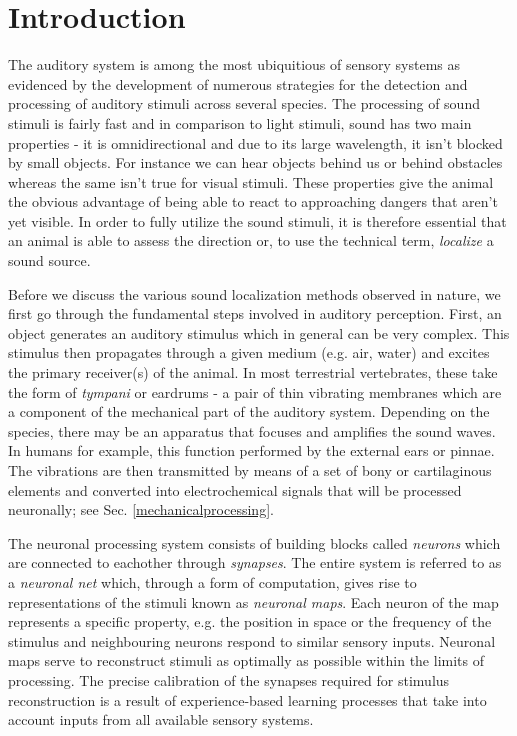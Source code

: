 \chapter{Introduction}\label{introchapter}
The auditory system is among the most ubiquitious of sensory systems as evidenced by the 
development of numerous strategies for the detection and processing of auditory stimuli
across several species. The processing of sound stimuli is fairly fast and in comparison
to light stimuli, sound has two main properties - it is omnidirectional and due to
its large wavelength, it isn't blocked by small objects. For instance we can hear objects
behind us or behind obstacles whereas the same isn't true for visual stimuli. These properties 
give the animal the obvious advantage of being able to react to approaching dangers that
aren't yet visible. In order to fully utilize the sound stimuli, it is therefore essential
that an animal is able to assess the direction or, to use the technical term, \textit{localize} a sound source.

Before we discuss the various sound localization methods observed in nature, we first
go through the fundamental steps involved in auditory perception. First, an object generates
an auditory stimulus which in general can be very complex. This stimulus then propagates
through a given medium (e.g. air, water) and excites the primary receiver(s) of the animal. In most
terrestrial vertebrates, these take the form of \textit{tympani} or eardrums - a pair of thin vibrating
membranes which are a component of the mechanical part of the auditory system.
Depending on the species, there may be an apparatus that focuses and amplifies the sound waves. In
humans for example, this function performed by the external ears or pinnae. 
The vibrations are then transmitted by means of a set of bony or cartilaginous elements and
converted into electrochemical signals that will be processed neuronally; see Sec. \ref{mechanicalprocessing}.

The neuronal processing system consists of building blocks called \textit{neurons} which are
connected to eachother through \textit{synapses}. The entire system is referred to as a 
\textit{neuronal net} which, through a form of computation, gives rise to representations of the stimuli
known as \textit{neuronal maps}. Each neuron of the map represents a specific property, e.g.
the position in space or the frequency of the stimulus and neighbouring neurons respond to
similar sensory inputs. Neuronal maps serve to reconstruct stimuli as optimally as possible
within the limits of processing. The precise calibration of the
synapses required for stimulus reconstruction is a result of experience-based learning
processes that take into account inputs from all available sensory systems.

